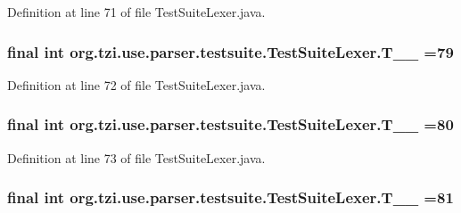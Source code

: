 Definition at line 71 of file Test\-Suite\-Lexer.\-java.

\hypertarget{classorg_1_1tzi_1_1use_1_1parser_1_1testsuite_1_1_test_suite_lexer_a42f8107a99e8a3976632afb9a8d47cc5}{
\subsubsection[{T\-\_\-\-\_\-79}]{\setlength{\rightskip}{0pt plus 5cm}final int org.\-tzi.\-use.\-parser.\-testsuite.\-Test\-Suite\-Lexer.\-T\-\_\-\-\_ =79\hspace{0.3cm}{\ttfamily [static]}}}\label{classorg_1_1tzi_1_1use_1_1parser_1_1testsuite_1_1_test_suite_lexer_a42f8107a99e8a3976632afb9a8d47cc5}


Definition at line 72 of file Test\-Suite\-Lexer.\-java.

\hypertarget{classorg_1_1tzi_1_1use_1_1parser_1_1testsuite_1_1_test_suite_lexer_abb7a1b2d2b2640338e2345a5e4a53788}{
\subsubsection[{T\-\_\-\-\_\-80}]{\setlength{\rightskip}{0pt plus 5cm}final int org.\-tzi.\-use.\-parser.\-testsuite.\-Test\-Suite\-Lexer.\-T\-\_\-\-\_ =80\hspace{0.3cm}{\ttfamily [static]}}}\label{classorg_1_1tzi_1_1use_1_1parser_1_1testsuite_1_1_test_suite_lexer_abb7a1b2d2b2640338e2345a5e4a53788}


Definition at line 73 of file Test\-Suite\-Lexer.\-java.

\hypertarget{classorg_1_1tzi_1_1use_1_1parser_1_1testsuite_1_1_test_suite_lexer_a6f22d9dba41dcc777d3671896b2c2803}{
\subsubsection[{T\-\_\-\-\_\-81}]{\setlength{\rightskip}{0pt plus 5cm}final int org.\-tzi.\-use.\-parser.\-testsuite.\-Test\-Suite\-Lexer.\-T\-\_\-\-\_ =81\hspace{0.3cm}{\ttfamily [static]}}}\label{classorg_1_1tzi_1_1use_1_1parser_1_1testsuite_1_1_test_suite_lexer_a6f22d9dba41dcc777d3671896b2c2803}


